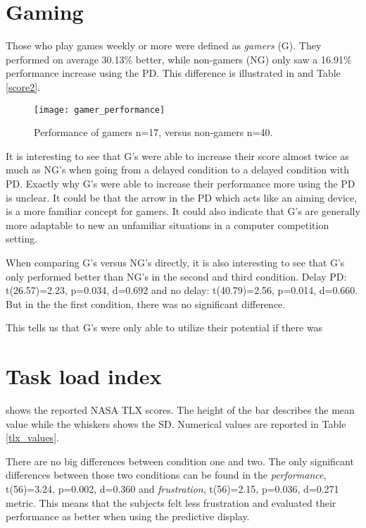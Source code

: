 \section{Gaming}

Those who play games weekly or more were defined as \emph{gamers} (G). They performed on average 30.13\% better, while non-gamers (NG) only saw a 16.91\% performance increase using the PD. This difference is illustrated in  and Table \ref{score2}.

\begin{figure}[h!]
    \centering
    \texttt{[image: gamer\_performance]}
    \caption{Performance of gamers n=17, versus non-gamers n=40.}
    \label{gamer_performance}
\end{figure}

It is interesting to see that G's were able to increase their score almost twice as much as NG's when going from a delayed condition to a delayed condition with PD. Exactly why G's were able to increase their performance more using the PD is unclear. It could be that the arrow in the PD which acts like an aiming device, is a more familiar concept for gamers. It could also indicate that G's are generally more adaptable to new an unfamiliar situations in a computer competition setting.

When comparing G's versus NG's directly, it is also interesting to see that G's only performed better than NG's in the second and third condition. Delay PD: t(26.57)=2.23, p=0.034, d=0.692 and no delay: t(40.79)=2.56, p=0.014, d=0.660. But in the the first condition, there was no significant difference.
\vspace{-5mm}

This tells us that G's were only able to utilize their potential if there was 


\section{Task load index}

 shows the reported NASA TLX scores. The height of the bar describes the mean value while the whiskers shows the SD. Numerical values are reported in Table \ref{tlx_values}.

There are no big differences between condition one and two. The only significant differences between those two conditions can be found in the \emph{performance}, t(56)=3.24, p=0.002, d=0.360 and \emph{frustration}, t(56)=2.15, p=0.036, d=0.271 metric. This means that the subjects felt less frustration and evaluated their performance as better when using the predictive display.

